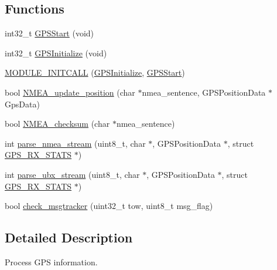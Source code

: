 \subsection*{\-Functions}
\begin{DoxyCompactItemize}
\item 
int32\-\_\-t \hyperlink{group___g_s_p_module_ga8050cbef253d91ff25e0df5f1633a96f}{\-G\-P\-S\-Start} (void)
\item 
int32\-\_\-t \hyperlink{group___g_s_p_module_gaaa9e652434fef66adb2ea7721f3ad640}{\-G\-P\-S\-Initialize} (void)
\item 
\hyperlink{group___g_s_p_module_ga26eba01dd90e72f58587731e20e8dc57}{\-M\-O\-D\-U\-L\-E\-\_\-\-I\-N\-I\-T\-C\-A\-L\-L} (\hyperlink{group___g_s_p_module_gaaa9e652434fef66adb2ea7721f3ad640}{\-G\-P\-S\-Initialize}, \hyperlink{group___g_s_p_module_ga8050cbef253d91ff25e0df5f1633a96f}{\-G\-P\-S\-Start})
\item 
bool \hyperlink{group___g_s_p_module_gafb07ad2b755c0395ac8d7f6e86965c44}{\-N\-M\-E\-A\-\_\-update\-\_\-position} (char $\ast$nmea\-\_\-sentence, \-G\-P\-S\-Position\-Data $\ast$\-Gps\-Data)
\item 
bool \hyperlink{group___g_s_p_module_ga5f520a9c350e8e1d1425e655b651cf14}{\-N\-M\-E\-A\-\_\-checksum} (char $\ast$nmea\-\_\-sentence)
\item 
int \hyperlink{group___g_s_p_module_ga0e248cf833b5f3723e388822f1552aa5}{parse\-\_\-nmea\-\_\-stream} (uint8\-\_\-t, char $\ast$, \-G\-P\-S\-Position\-Data $\ast$, struct \hyperlink{struct_g_p_s___r_x___s_t_a_t_s}{\-G\-P\-S\-\_\-\-R\-X\-\_\-\-S\-T\-A\-T\-S} $\ast$)
\item 
int \hyperlink{group___g_s_p_module_ga88dff12629e2c3266f00a05836b67758}{parse\-\_\-ubx\-\_\-stream} (uint8\-\_\-t, char $\ast$, \-G\-P\-S\-Position\-Data $\ast$, struct \hyperlink{struct_g_p_s___r_x___s_t_a_t_s}{\-G\-P\-S\-\_\-\-R\-X\-\_\-\-S\-T\-A\-T\-S} $\ast$)
\item 
bool \hyperlink{group___g_s_p_module_gae7fdef747a5bfe514633f6925b6ffedf}{check\-\_\-msgtracker} (uint32\-\_\-t tow, uint8\-\_\-t msg\-\_\-flag)
\end{DoxyCompactItemize}


\subsection{\-Detailed \-Description}
\-Process \-G\-P\-S information. 

